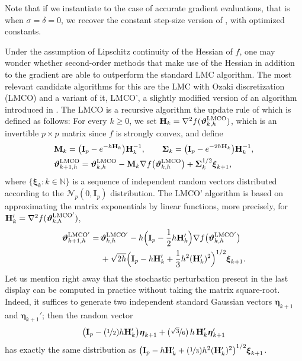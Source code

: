 \documentclass[aoap,preprint,reqno,a4paper]{imsart} %
\newcommand{\NN}{\mathbb{N}}
\newcommand{\bvartheta}{\boldsymbol{\vartheta}}
\newcommand{\bxi}{\boldsymbol{\xi}}
\newcommand{\bfeta}{{\boldsymbol{\eta}}}
\newcommand{\bfH}{\mathbf H}
\newcommand{\bfM}{\mathbf M}
\newcommand{\bfI}{\mathbf I}
\newcommand{\bfSigma}{\boldsymbol\Sigma}
\begin{document}
Note that if we instantiate  to the case of accurate gradient evaluations, that is
when $\sigma=\delta=0$, we recover the constant step-size version of \citep[Theorem 8]{Durmus2},
with optimized constants.

Under the assumption of Lipschitz continuity of the Hessian of $f$, one may wonder whether
second-order methods that make use of the Hessian in addition to the gradient are able
to outperform the standard LMC algorithm. The most relevant candidate algorithms for
this are the LMC with Ozaki discretization (LMCO) and a variant of it, LMCO', a slightly
modified version of an algorithm introduced in \citep{Dalalyan14}. The LMCO is a recursive
algorithm the update rule of which is defined as
follows: For every $k\ge 0$, we set $\bfH_{k} = \nabla^2 f(\bvartheta_{k,h}^{\rm LMCO})$,
which is an invertible $p\times p$ matrix since $f$ is strongly convex, and define
\begin{align}
&\bfM_k = \big(\bfI_p-e^{-h\bfH_k}\big)\bfH_k^{-1},\qquad
\bfSigma_k  = \big(\bfI_p-e^{-2h\bfH_k}\big)\bfH_k^{-1}, \\
&\bvartheta_{k+1,h}^{\rm LMCO} = \bvartheta_{k,h}^{\rm LMCO}
	-\bfM_k\nabla f\big(\bvartheta_{k,h}^{\rm LMCO}\big) +\bfSigma_k^{1/2}\bxi_{k+1},\label{update}
\end{align}
where $\{\bxi_{k}:k\in\NN\}$ is a sequence of independent random vectors distributed according
to the $\mathcal N_p(0,\bfI_p)$ distribution. The LMCO' algorithm is based on approximating the
matrix exponentials by linear functions, more precisely, for $\bfH_k' = \nabla^2 f(\bvartheta_{k,h}^{\rm LMCO'})$,
\begin{align}
\bvartheta_{k+1,h}^{\rm LMCO'} =\, &\bvartheta_{k,h}^{\rm LMCO'}-h\Big(\bfI_p-\frac12h\bfH_k'\Big)
\nabla f\big(\bvartheta_{k,h}^{\rm LMCO'}\big)\\
 &+ \sqrt{2h}\Big(\bfI_p-h\bfH_k'+\frac13h^2(\bfH_k')^2\Big)^{1/2}\bxi_{k+1}.
\label{update1}
\end{align}
Let us mention right away that the stochastic perturbation present in the last display can be
computed in practice without taking the matrix square-root. Indeed, it suffices to generate
two independent standard Gaussian vectors $\bfeta_{k+1}$ and $\bfeta_{k+1}'$; then  the random vector
\begin{align}
\big(\bfI_p-(\nicefrac12)h\bfH_k'\big)\bfeta_{k+1}+(\nicefrac{\sqrt{3}}{6})\,h \,\bfH_k'\bfeta'_{k+1}
\end{align}
has exactly the same distribution as
$\big(\bfI_p-h\bfH_k'+(\nicefrac13)h^2(\bfH_k')^2\big)^{1/2}\bxi_{k+1}$.
\end{document}
